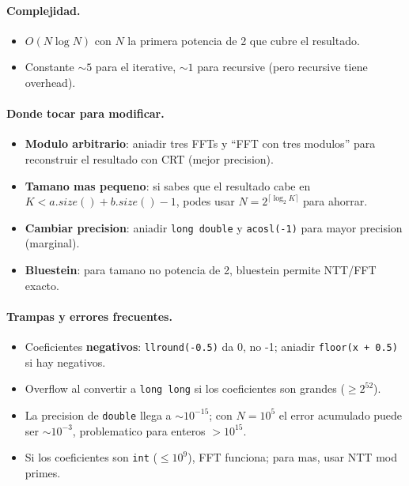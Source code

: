 \paragraph{Complejidad.}
\begin{itemize}\setlength\itemsep{0pt}
	\item $O(N \log N)$ con $N$ la primera potencia de 2 que cubre el resultado.
	\item Constante $\sim 5$ para el iterative, $\sim 1$ para recursive (pero recursive tiene overhead).
\end{itemize}

\paragraph{Donde tocar para modificar.}
\begin{itemize}\setlength\itemsep{0pt}
	\item \textbf{Modulo arbitrario}: aniadir tres FFTs y ``FFT con tres modulos'' para reconstruir el resultado con CRT (mejor precision).
	\item \textbf{Tamano mas pequeno}: si sabes que el resultado cabe en $K < a.size() + b.size() - 1$, podes usar $N = 2^{\lceil \log_2 K \rceil}$ para ahorrar.
	\item \textbf{Cambiar precision}: aniadir \texttt{long double} y \texttt{acosl(-1)} para mayor precision (marginal).
	\item \textbf{Bluestein}: para tamano no potencia de 2, bluestein permite NTT/FFT exacto.
\end{itemize}

\paragraph{Trampas y errores frecuentes.}
\begin{itemize}\setlength\itemsep{0pt}
	\item Coeficientes \textbf{negativos}: \texttt{llround(-0.5)} da 0, no -1; aniadir \texttt{floor(x + 0.5)} si hay negativos.
	\item Overflow al convertir a \texttt{long long} si los coeficientes son grandes ($\ge 2^{52}$).
	\item La precision de \texttt{double} llega a $\sim 10^{-15}$; con $N = 10^5$ el error acumulado puede ser $\sim 10^{-3}$, problematico para enteros $> 10^{15}$.
	\item Si los coeficientes son \texttt{int} ($\le 10^9$), FFT funciona; para mas, usar NTT mod primes.
\end{itemize}

